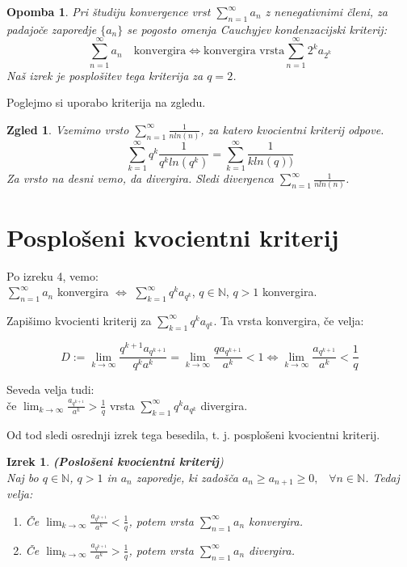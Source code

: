\documentclass[a4paper,12pt]{article}
\def\N{\mathbb{N}} %
\newtheorem{izrek}{Izrek}
\newtheorem{opomba}{Opomba}
\newtheorem{zgled}{Zgled}
\begin{document}
\begin{opomba}
    Pri študiju konvergence vrst $\sum_{n = 1}^{\infty}{a_n}$ z nenegativnimi členi, 
    za padajoče zaporedje $\{a_n\}$ se pogosto omenja \emph{Cauchyjev kondenzacijski kriterij}:
    \[
        \sum_{n = 1}^{\infty}{a_n} \quad \text{konvergira} \iff \text{konvergira vrsta}
        \sum_{n = 1}^{\infty}{2^ka_{2^k}}
    \]
    Naš izrek je posplošitev tega kriterija za $q = 2$.
\end{opomba}

\noindent
Poglejmo si uporabo kriterija na zgledu.
\begin{zgled}
    Vzemimo vrsto $\sum_{n = 1}^{\infty}{\frac{1}{nln(n)}}$, za katero kvocientni kriterij odpove.
    \[
        \sum_{k = 1}^{\infty}{q^k\frac{1}{q^kln(q^k)}} =
        \sum_{k = 1}^{\infty}{\frac{1}{kln(q))}}
    \]
    Za vrsto na desni vemo, da divergira. Sledi divergenca $\sum_{n = 1}^{\infty}{\frac{1}{nln(n)}}$.
\end{zgled}


\section{Posplošeni kvocientni kriterij}
Po izreku 4, vemo: \\
$\sum_{n = 1}^{\infty}{a_n}$ konvergira $\iff$
$\sum_{k = 1}^{\infty}{q^ka_{q^k}}$, $q \in {\mathbb{N}}$, $q > 1$  konvergira.

Zapišimo kvocienti kriterij za $\sum_{k = 1}^{\infty}{q^ka_{q^k}}$. Ta vrsta konvergira, če velja:

\[  
    D := 
    \lim_{k \to \infty}{\frac{q^{k + 1}a_{q^{k + 1}}}{q^ka^k}}  =
    \lim_{k \to \infty}{\frac{qa_{q^{k + 1}}}{a^k}} < 1
    \iff
    \lim_{k \to \infty}{\frac{a_{q^{k + 1}}}{a^k}} < \frac{1}{q}
\]

\noindent
Seveda velja tudi:\\
če $\lim_{k \to \infty}{\frac{a_{q^{k + 1}}}{a^k}} > \frac{1}{q}$
vrsta $\sum_{k = 1}^{\infty}{q^ka_{q^k}}$ divergira. 


Od tod sledi osrednji izrek tega besedila, t. j. posplošeni kvocientni kriterij.

\begin{izrek}\textbf{(Poslošeni kvocientni kriterij})\\
Naj bo $q \in \N$, $q > 1$ in ${a_n}$ zaporedje,
ki zadošča $a_{n} \geq a_{n+1} \geq 0 \text{,} \quad \forall n \in \N$.
Tedaj velja:

\begin{enumerate}
    \item Če $\lim_{k \to \infty}{\frac{a_{q^{k + 1}}}{a^k}} < \frac{1}{q}$,
    potem vrsta $\sum_{n = 1}^{\infty}{a_n}$ konvergira.
    \item Če $\lim_{k \to \infty}{\frac{a_{q^{k + 1}}}{a^k}} > \frac{1}{q}$,
    potem vrsta $\sum_{n = 1}^{\infty}{a_n}$ divergira.
\end{enumerate}
\end{izrek}
\end{document}

